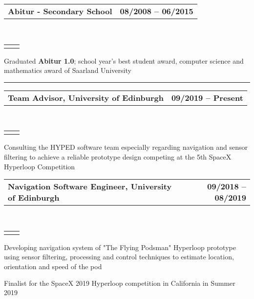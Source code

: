 \documentclass[]{lukas-cv}
\makeatletter
\newcommand{\headerrow}[2]
{\begin{tabular*}{\linewidth}{l@{\extracolsep{\fill}}r}
	\fontspec{Helvetica}\fontsize{12pt}{12pt}\selectfont\bfseries{\color{subheadings}#1} &
	\fontspec{Helvetica}\fontsize{12pt}{12pt}\selectfont\bfseries{\color{subheadings}#2} \\
\end{tabular*}}
\newcommand{\locationrow}[2]
{\begin{tabular*}{\linewidth}{l@{\extracolsep{\fill}}r}
        \color{headings}\scshape\fontspec{Heiti TC Medium}\fontsize{10pt}{12pt}\selectfont{#1}  &
        \color{headings}\scshape\fontspec{Heiti TC Medium}\fontsize{10pt}{12pt}\selectfont{#2}  \\
\end{tabular*}}
\makeatother
\begin{document}
\noindent
\headerrow{Abitur - Secondary School}{08/2008 -- 06/2015}
\\
\locationrow{Warndtgymnasium Geislautern, Völklingen}{Geislautern, Germany}
\begin{tightitemize}{1.7em}
    \item Graduated \textbf{Abitur 1.0}; school year's best student award, computer science and mathematics award of Saarland University
\end{tightitemize}
\largesectionsep


\hrule
\vspace{0.4em}

\noindent
\headerrow{Team Advisor, University of Edinburgh}{09/2019 -- Present}
\\
\locationrow{HYPED -- University of Edinburgh Hyperloop Team}{}
\begin{tightitemize}{1.7em}
    \item Consulting the HYPED software team especially regarding navigation and sensor filtering to achieve a reliable prototype design competing at the 5th SpaceX Hyperloop Competition
\end{tightitemize}
\largesectionsep

\noindent
\headerrow{Navigation Software Engineer, University of Edinburgh}{09/2018 -- 08/2019}
\\
\locationrow{HYPED -- University of Edinburgh Hyperloop Team}{}
\begin{tightitemize}{1.7em}
    \item Developing navigation system of "The Flying Podsman" Hyperloop prototype using sensor filtering, processing and control techniques to estimate location, orientation and speed of the pod
    \item Finalist for the SpaceX 2019 Hyperloop competition in California in Summer 2019
\end{tightitemize}
\largesectionsep


\end{document}
